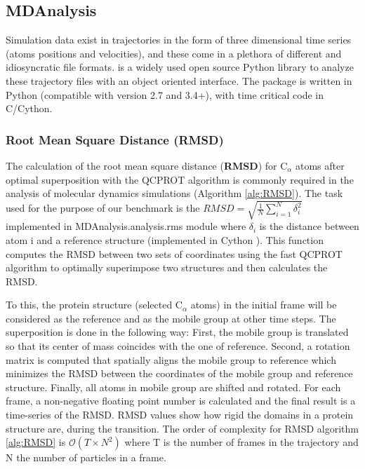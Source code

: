 \label{use_cases}

\subsection{MDAnalysis}
Simulation data exist in trajectories in the form of three dimensional time series (atoms positions and velocities), and these come in a plethora of different and idiosyncratic file formats. 
 is a widely used open source Python library to analyze these trajectory files with an object oriented interface. 
The package is written in Python (compatible with version 2.7 and 3.4+), with time critical code in C/Cython. 
\label{sec:mda}

\subsubsection{Root Mean Square Distance (RMSD)}
The calculation of the root mean square distance (\textbf{RMSD}) for C$_{\alpha}$ atoms after
optimal superposition with the QCPROT algorithm \cite{Liu:2010kx,Theobald:2005vn} is commonly required in the analysis of molecular dynamics simulations (Algorithm \ref{alg:RMSD}). 
The task used for the purpose of our benchmark is the $RMSD=\sqrt{\frac{1}{N}\sum_{i=1}^{N}\delta_{i}^{2}}$ implemented in MDAnalysis.analysis.rms module where $\delta_{i}$ is the distance between atom i and a reference structure (implemented in Cython \cite{Gowers:2016aa}).  
This function computes the RMSD between two sets of coordinates using the fast QCPROT algorithm to optimally superimpose two structures and then calculates the RMSD. 

To this, the protein structure (selected C$_{\alpha}$ atoms) in the initial frame will be considered as the reference and as the mobile group at other time steps. 
The superposition is done in the following way:
First, the mobile group is translated so that its center of mass coincides with the one of reference. 
Second, a rotation matrix is computed that spatially aligns the mobile group to reference which minimizes the RMSD between the coordinates of the mobile group and reference structure. 
Finally, all atoms in mobile group are shifted and rotated.
For each frame, a non-negative floating point number is calculated and the final result is a time-series of the RMSD. 
RMSD values show how rigid the domains in a protein structure are, during the transition. 
The order of complexity for RMSD algorithm \ref{alg:RMSD} is $\mathcal{O}(T \times N^{2})$ \cite{rmsd} where T is the number of frames in the trajectory and N the number of particles in a 
frame.

